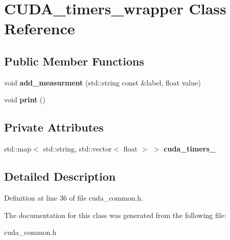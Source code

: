 \hypertarget{class_c_u_d_a__timers__wrapper}{}\section{C\+U\+D\+A\+\_\+timers\+\_\+wrapper Class Reference}
\label{class_c_u_d_a__timers__wrapper}
\subsection*{Public Member Functions}
\begin{DoxyCompactItemize}
\item 
\hypertarget{class_c_u_d_a__timers__wrapper_a8485cbd33246af58b26ee44d79a00236}{}void {\bfseries add\+\_\+measurment} (std\+::string const \&label, float value)\label{class_c_u_d_a__timers__wrapper_a8485cbd33246af58b26ee44d79a00236}

\item 
\hypertarget{class_c_u_d_a__timers__wrapper_ab27d013adcdf15cb4b1e4c26ec0b5442}{}void {\bfseries print} ()\label{class_c_u_d_a__timers__wrapper_ab27d013adcdf15cb4b1e4c26ec0b5442}

\end{DoxyCompactItemize}
\subsection*{Private Attributes}
\begin{DoxyCompactItemize}
\item 
\hypertarget{class_c_u_d_a__timers__wrapper_ac070674095885b2e913cecf8c1349583}{}std\+::map$<$ std\+::string, std\+::vector$<$ float $>$ $>$ {\bfseries cuda\+\_\+timers\+\_\+}\label{class_c_u_d_a__timers__wrapper_ac070674095885b2e913cecf8c1349583}

\end{DoxyCompactItemize}


\subsection{Detailed Description}


Definition at line 36 of file cuda\+\_\+common.\+h.



The documentation for this class was generated from the following file\+:\begin{DoxyCompactItemize}
\item 
cuda\+\_\+common.\+h\end{DoxyCompactItemize}
